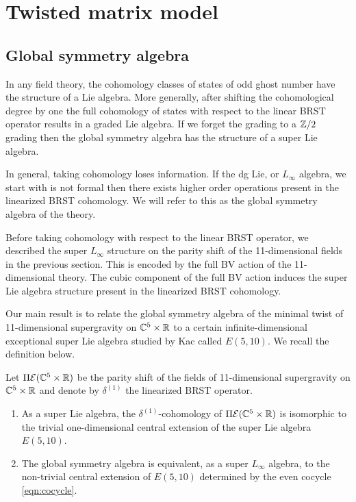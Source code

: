 \section{Twisted matrix model}

\subsection{Global symmetry algebra}
\label{sec:global}

In any field theory, the cohomology classes of states of odd ghost number have the structure of a Lie algebra. 
More generally, after shifting the cohomological degree by one the full cohomology of states with respect to the linear BRST operator results in a graded Lie algebra. 
If we forget the grading to a $\mathbb Z/2$ grading then the global symmetry algebra has the structure of a super Lie algebra. 

In general, taking cohomology loses information. 
If the dg Lie, or $L_\infty$ algebra, we start with is not formal then there exists higher order operations present in the linearized BRST cohomology. 
We will refer to this as the global symmetry algebra of the theory.

Before taking cohomology with respect to the linear BRST operator, we described the super $L_\infty$ structure on the parity shift of the 11-dimensional fields in the previous section. 
This is encoded by the full BV action of the 11-dimensional theory.
The cubic component of the full BV action induces the super Lie algebra structure present in the linearized BRST cohomology. 

Our main result is to relate the global symmetry algebra of the minimal twist of 11-dimensional supergravity on $\mathbb C^5 \times \mathbb R$ to a certain infinite-dimensional exceptional super Lie algebra studied by Kac \cite{KacBible,KacE510} called $E(5,10)$.
We recall the definition below. 

\begin{thm}\label{thm:global}
Let $\Pi\mathcal E(\mathbb C^5 \times \mathbb R)$ be the parity shift of the fields of 11-dimensional supergravity on $\mathbb C^5 \times \mathbb R$ and denote by $\delta^{(1)}$ the linearized BRST operator. 
\begin{enumerate}
\item 
As a super Lie algebra, the $\delta^{(1)}$-cohomology of $\Pi\mathcal E(\mathbb C^5 \times \mathbb R)$ is isomorphic to the trivial one-dimensional central extension of the super Lie algebra $E(5,10)$.
\item 
The global symmetry algebra is equivalent, as a super $L_\infty$ algebra, to the non-trivial central extension of $E(5,10)$ determined by the even cocycle \eqref{eqn:cocycle}. 
\end{enumerate}
\end{thm}

